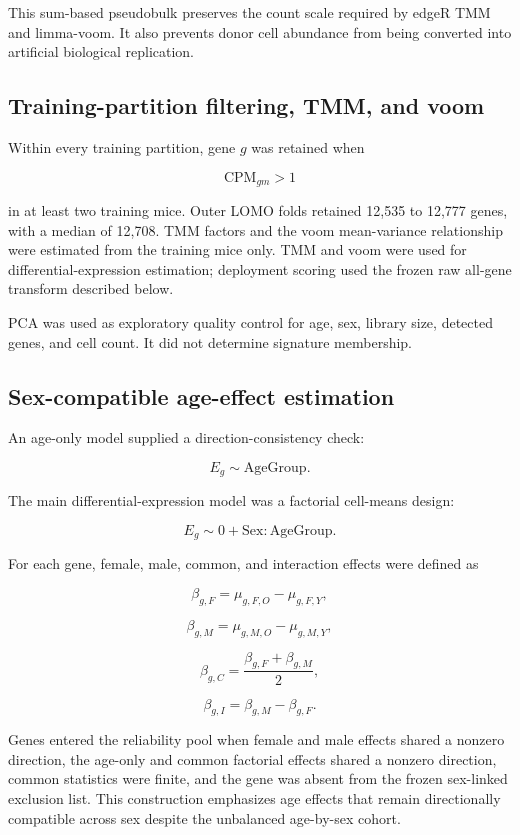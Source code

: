 \documentclass[10pt,twocolumn]{article}
\begin{document}
This sum-based pseudobulk preserves the count scale required by edgeR TMM and limma-voom. It also prevents donor cell abundance from being converted into artificial biological replication.

\subsection{Training-partition filtering, TMM, and voom}\label{training-partition-filtering-tmm-and-voom}

Within every training partition, gene \(g\) was retained when

\[
\mathrm{CPM}_{gm}>1
\]

in at least two training mice. Outer LOMO folds retained 12,535 to 12,777 genes, with a median of 12,708. TMM factors and the voom mean-variance relationship were estimated from the training mice only. TMM and voom were used for differential-expression estimation; deployment scoring used the frozen raw all-gene transform described below.

PCA was used as exploratory quality control for age, sex, library size, detected genes, and cell count. It did not determine signature membership.

\subsection{Sex-compatible age-effect estimation}\label{sex-compatible-age-effect-estimation}

An age-only model supplied a direction-consistency check:

\[
E_g\sim \mathrm{AgeGroup}.
\]

The main differential-expression model was a factorial cell-means design:

\[
E_g\sim 0+\mathrm{Sex}:\mathrm{AgeGroup}.
\]

For each gene, female, male, common, and interaction effects were defined as

\[
\beta_{g,F}=\mu_{g,F,O}-\mu_{g,F,Y},
\]

\[
\beta_{g,M}=\mu_{g,M,O}-\mu_{g,M,Y},
\]

\[
\beta_{g,C}=\frac{\beta_{g,F}+\beta_{g,M}}{2},
\]

\[
\beta_{g,I}=\beta_{g,M}-\beta_{g,F}.
\]

Genes entered the reliability pool when female and male effects shared a nonzero direction, the age-only and common factorial effects shared a nonzero direction, common statistics were finite, and the gene was absent from the frozen sex-linked exclusion list. This construction emphasizes age effects that remain directionally compatible across sex despite the unbalanced age-by-sex cohort.
\end{document}
